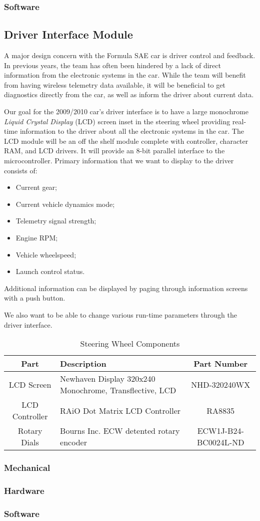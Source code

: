 \subsubsection{Software}

%
%

\subsection{Driver Interface Module}

A major design concern with the Formula SAE car is driver control and feedback. In previous years, the team has often been hindered by a lack of direct information from the electronic systems in the car. While the team will benefit from having wireless telemetry data available, it will be beneficial to get diagnostics directly from the car, as well as inform the driver about current data.

Our goal for the 2009/2010 car's driver interface is to have a large monochrome \emph{Liquid Crystal Display} (LCD) screen inset in the steering wheel providing real-time information to the driver about all the electronic systems in the car. The LCD module will be an off the shelf module complete with controller, character RAM, and LCD drivers. It will provide an 8-bit parallel interface to the microcontroller. Primary information that we want to display to the driver consists of:
\begin{itemize}
\item Current gear;
\item Current vehicle dynamics mode;
\item Telemetry signal strength;
\item Engine RPM;
\item Vehicle wheelspeed;
\item Launch control status.
\end{itemize}
Additional information can be displayed by paging through information screens with a push button.

We also want to be able to change various run-time parameters through the driver interface.

\begin{table}[H]
\caption{Steering Wheel Components\label{tab:Steering-Wheel-Components}}

\centering{}\begin{tabular}{|c|>{\centering}p{15em}|c|}
\hline 
Part & Description & Part Number\tabularnewline
\hline
\hline 
LCD Screen & Newhaven Display 320x240 Monochrome, Transflective, LCD & NHD-320240WX\tabularnewline
\hline 
LCD Controller & RAiO Dot Matrix LCD Controller & RA8835\tabularnewline
\hline 
Rotary Dials & Bourns Inc. ECW detented rotary encoder & ECW1J-B24-BC0024L-ND\tabularnewline
\hline
\end{tabular}
\end{table}

\subsubsection{Mechanical}
\subsubsection{Hardware}
\subsubsection{Software}
